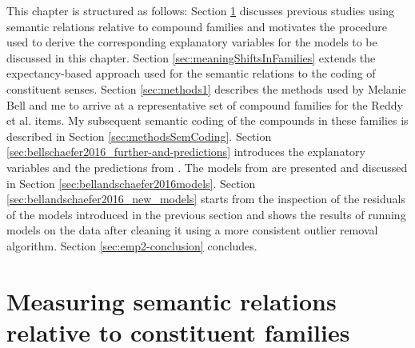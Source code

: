 This chapter is structured as follows: Section
\ref{sec:operationalization-sem-rel} discusses previous studies
using semantic relations relative to compound families and motivates
the procedure used to derive the corresponding explanatory variables
for the models to be discussed in this chapter. Section
\ref{sec:meaningShiftsInFamilies} extends the expectancy-based
approach used for the semantic relations to the coding of constituent
senses. Section \ref{sec:methods1} describes the methods used by
Melanie Bell and me to arrive
at a representative set of compound families for the
Reddy et al. items. My subsequent semantic coding of the compounds in
these families is described in Section \ref{sec:methodsSemCoding}. Section \ref{sec:bellschaefer2016_further-and-predictions} introduces the explanatory variables
and the predictions from \citet{BellandSchaefer:2016}. The models
from \citet{BellandSchaefer:2016} are presented and discussed in
Section \ref{sec:bellandschaefer2016models}. Section
\ref{sec:bellandschaefer2016_new_models} starts from the inspection of
the residuals of the models introduced in the previous section and shows
the results of running models on the data after cleaning it using a
more consistent outlier removal algorithm. 
Section \ref{sec:emp2-conclusion} concludes.

\section[Semantic relations relative to constituent families]{Measuring semantic relations relative to constituent families}
\label{sec:operationalization-sem-rel}

